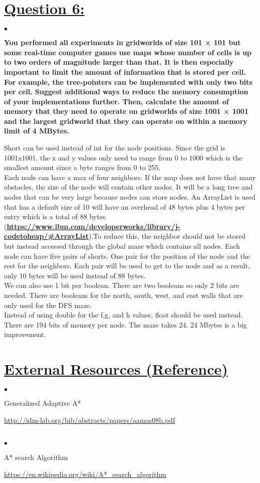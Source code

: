 \documentclass{article}
\begin{document}
\section{\underline{Question 6:}}
$\bullet$ {\large \textbf{You performed all experiments in gridworlds of size 101 × 101 but some real-time computer games use maps whose number of cells is up to two orders of magnitude larger than that. It is then especially important to limit the amount of information that is stored per cell. For example, the tree-pointers can be implemented with only two bits per cell. Suggest additional ways to reduce the memory consumption of your implementations further. Then, calculate the amount of memory that they need to operate on gridworlds of size 1001 × 1001 and the largest gridworld that they can operate on within a memory limit of 4 MBytes.}\\\par}
{\large Short can be used instead of int for the node positions. Since the grid is 1001x1001, the x and y values only need to range from 0 to 1000 which is the smallest amount since a byte ranges from 0 to 255.\\Each node can have a max of four neighbors. If the map does not have that many obstacles, the size of the node will contain other nodes. It will be a long tree and nodes that can be very large because nodes can store nodes. An ArrayList is used that has a default size of 10 will have an overhead of 48 bytes plus 4 bytes per entry which is a total of 88 bytes (\textbf{\url{https://www.ibm.com/developerworks/library/j-codetoheap/#ArrayList}}).To reduce this, the neighbor should not be stored but instead accessed through the global maze which contains all nodes. Each node can have five pairs of shorts. One pair for the position of the node and the rest for the neighbors. Each pair will be used to get to the node and as a result, only 10 bytes will be used instead of 88 bytes.\\We can also use 1 bit per boolean. There are two booleans so only 2 bits are needed. There are booleans for the north, south, west, and east walls that are only used for the DFS maze. \\Instead of using double for the f,g, and h values, float should be used instead. There are 194 bits of memory per node. The maze takes 24. 24 Mbytes is a big improvement.}\\
\section{\underline{External Resources (Reference)}}
$\bullet$ {\large Generalized Adaptive A* \\\par\underline{\url{http://idm-lab.org/bib/abstracts/papers/aamas08b.pdf}}}\\
$\\\bullet$ {\large A* search Algorithm\\\par \underline{\url{https://en.wikipedia.org/wiki/A*\_search\_algorithm}}}
\end{document}
